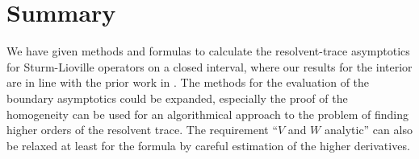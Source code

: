 \section{Summary}
We have given methods and formulas to calculate the resolvent-trace asymptotics
for Sturm-Lioville operators on a closed interval, where our results for the
interior are in line with the prior work in \cite{Gel'fand1975}. The methods for
the evaluation of the boundary asymptotics could be expanded, especially the
proof of the homogeneity can be used for an algorithmical approach to the
problem of finding higher orders of the resolvent trace. The requirement
"`$V$ and $W$ analytic"' can also be relaxed at least for the formula by careful
estimation of the higher derivatives.
